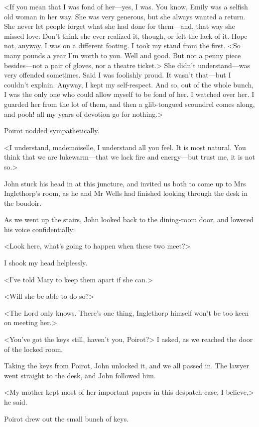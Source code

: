  <If you mean that I was fond of her—yes, I was. You know, Emily was a selfish old woman in her way. She was very generous, but she always wanted a return. She never let people forget what she had done for them—and, that way she missed love. Don't think she ever realized it, though, or felt the lack of it. Hope not, anyway. I was on a different footing. I took my stand from the first. <So many pounds a year I'm worth to you. Well and good. But not a penny piece besides—not a pair of gloves, nor a theatre ticket.> She didn't understand—was very offended sometimes. Said I was foolishly proud. It wasn't that—but I couldn't explain. Anyway, I kept my self-respect. And so, out of the whole bunch, I was the only one who could allow myself to be fond of her. I watched over her. I guarded her from the lot of them, and then a glib-tongued scoundrel comes along, and pooh! all my years of devotion go for nothing.> 

 Poirot nodded sympathetically. 

 <I understand, mademoiselle, I understand all you feel. It is most natural. You think that we are lukewarm—that we lack fire and energy—but trust me, it is not so.> 

 John stuck his head in at this juncture, and invited us both to come up to Mrs Inglethorp's room, as he and Mr Wells had finished looking through the desk in the boudoir. 

 As we went up the stairs, John looked back to the dining-room door, and lowered his voice confidentially: 

 <Look here, what's going to happen when these two meet?> 

 I shook my head helplessly. 

 <I've told Mary to keep them apart if she can.> 

 <Will she be able to do so?> 

 <The Lord only knows. There's one thing, Inglethorp himself won't be too keen on meeting her.> 

 <You've got the keys still, haven't you, Poirot?> I asked, as we reached the door of the locked room. 

 Taking the keys from Poirot, John unlocked it, and we all passed in. The lawyer went straight to the desk, and John followed him. 

 <My mother kept most of her important papers in this despatch-case, I believe,> he said. 

 Poirot drew out the small bunch of keys. 

